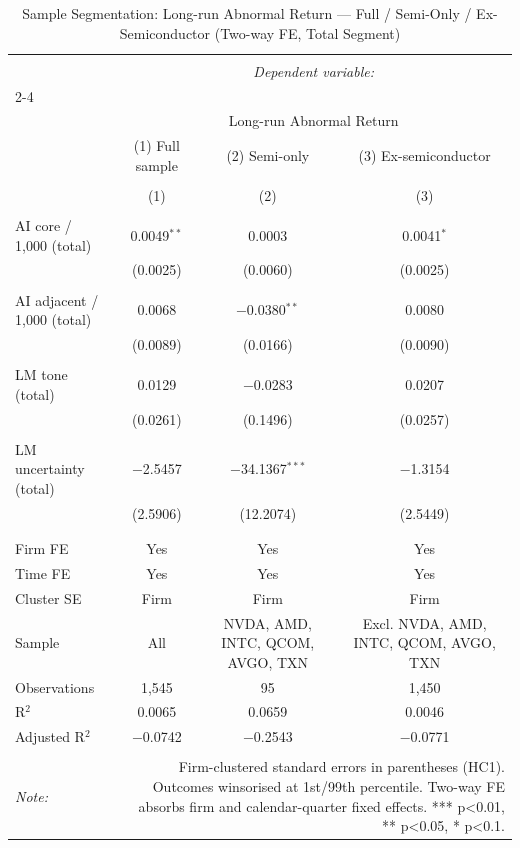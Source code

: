 
\begin{table}[!htbp] \centering 
  \caption{Sample Segmentation: Long-run Abnormal Return — Full / Semi-Only / Ex-Semiconductor (Two-way FE, Total Segment)} 
  \label{} 
\begin{tabular}{@{\extracolsep{5pt}}lccc} 
\\[-1.8ex]\hline 
\hline \\[-1.8ex] 
 & \multicolumn{3}{c}{\textit{Dependent variable:}} \\ 
\cline{2-4} 
\\[-1.8ex] & \multicolumn{3}{c}{Long-run Abnormal Return} \\ 
 & (1) Full sample & (2) Semi-only & (3) Ex-semiconductor \\ 
\\[-1.8ex] & (1) & (2) & (3)\\ 
\hline \\[-1.8ex] 
 AI core / 1,000 (total) & 0.0049$^{**}$ & 0.0003 & 0.0041$^{*}$ \\ 
  & (0.0025) & (0.0060) & (0.0025) \\ 
  & & & \\ 
 AI adjacent / 1,000 (total) & 0.0068 & $-$0.0380$^{**}$ & 0.0080 \\ 
  & (0.0089) & (0.0166) & (0.0090) \\ 
  & & & \\ 
 LM tone (total) & 0.0129 & $-$0.0283 & 0.0207 \\ 
  & (0.0261) & (0.1496) & (0.0257) \\ 
  & & & \\ 
 LM uncertainty (total) & $-$2.5457 & $-$34.1367$^{***}$ & $-$1.3154 \\ 
  & (2.5906) & (12.2074) & (2.5449) \\ 
  & & & \\ 
\hline \\[-1.8ex] 
Firm FE & Yes & Yes & Yes \\ 
Time FE & Yes & Yes & Yes \\ 
Cluster SE & Firm & Firm & Firm \\ 
Sample & All & NVDA, AMD, INTC, QCOM, AVGO, TXN & Excl. NVDA, AMD, INTC, QCOM, AVGO, TXN \\ 
Observations & 1,545 & 95 & 1,450 \\ 
R$^{2}$ & 0.0065 & 0.0659 & 0.0046 \\ 
Adjusted R$^{2}$ & $-$0.0742 & $-$0.2543 & $-$0.0771 \\ 
\hline 
\hline \\[-1.8ex] 
\textit{Note:}  & \multicolumn{3}{r}{Firm-clustered standard errors in parentheses (HC1). Outcomes winsorised at 1st/99th percentile. Two-way FE absorbs firm and calendar-quarter fixed effects. *** p<0.01, ** p<0.05, * p<0.1.} \\ 
\end{tabular} 
\end{table} 
